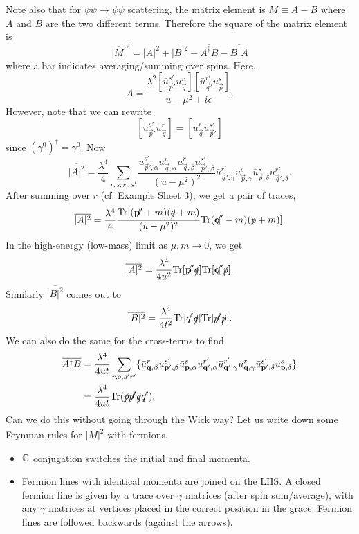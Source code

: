 Note also that for $\psi\psi\to\psi\psi$ scattering, the matrix element is $M\equiv A-B$ where $A$ and $B$ are the two different terms. Therefore the square of the matrix element is
$$\overline{|M|}^2=\overline{|A|^2}+\overline{|B|^2}-\overline{A^\dagger B}- \overline{B^\dagger A}$$
where a bar indicates averaging/summing over spins. Here,
$$A=\frac{\lambda^2 [\bar u_{\vec p'}^{s'} u_{\vec q}^r][\bar u_{\vec q'}^{r'}u_{\vec p}^s]}{u-\mu^2+i\epsilon}.$$
However, note that we can rewrite 
$$[\bar u_{\vec p'}^{s'} u_{\vec q}^r]=[\bar u_{\vec q}^r u_{\vec p'}^{s'}]$$
since $(\gamma^0)^\dagger = \gamma^0.$
Now
$$\overline{|A|^2}=\frac{\lambda^4}{4}\sum_{r,s,r',s'}\frac{\bar u_{\vec p',\alpha}^{s'} u_{\vec q,\alpha}^r \bar u_{\vec q,\beta}^r u_{\vec p',\beta}^{s'}}{(u-\mu^2)^2}\bar u_{\vec q',\gamma}^{r'}u_{\vec p, \gamma}^s \bar u_{\vec p,\delta}^s u_{\vec q',\delta}^{r'}.$$
After summing over $r$ (cf. Example Sheet 3), we get a pair of traces,
$$\overline{|A|^2}=\frac{\lambda^4}{4}\frac{\text{Tr}[(\slashed{\vec p'}+m)(\slashed{q}+m)}{(u-\mu^2)^2}\text{Tr}(\slashed{\vec q'}-m)(\slashed{p}+m)].$$
In the high-energy (low-mass) limit as $\mu,m\to 0$, we get
$$\overline{|A|^2}=\frac{\lambda^4}{4u^2}\text{Tr}[\slashed{\vec p'}\slashed{q}]\text{Tr}[\slashed{\vec q'}\slashed{p}].$$
Similarly $\overline{|B|^2}$ comes out to
$$\overline{|B|^2}=\frac{\lambda^4}{4t^2}\text{Tr}[\slashed{q'}\slashed{q}]\text{Tr}[\slashed{p'}\slashed{p}].$$
We can also do the same for the cross-terms to find
\begin{align*}
    \overline{A^\dagger B}&=\frac{\lambda^4}{4ut} \sum_{r,s,s'r'}\{\bar u_{\boldsymbol{\mathbf{q}},\beta}^r u_{\boldsymbol{\mathbf{p}}',\beta}^{s'} \bar u_{\boldsymbol{\mathbf{p}},\alpha}^s u_{\boldsymbol{\mathbf{q}}',\alpha}^{r'} \bar u_{\boldsymbol{\mathbf{q}}',\gamma}^{r'} u_{\boldsymbol{\mathbf{q}},\gamma}^r \bar u_{\boldsymbol{\mathbf{p}}',\delta}^{s'}u_{\boldsymbol{\mathbf{p}},\delta}^s\}\\
    &=\frac{\lambda^4}{4ut}\text{Tr}(\slashed{p}\slashed{p'}\slashed{q}\slashed{q'}).
\end{align*}
Can we do this without going through the Wick way? Let us write down some Feynman rules for $\overline{|M|^2}$ with fermions.
\begin{itemize}
    \item $\mathbb{C}$ conjugation switches the initial and final momenta.
    \item Fermion lines with identical momenta are joined on the LHS. A closed fermion line is given by a trace over $\gamma$ matrices (after spin sum/average), with any $\gamma$ matrices at vertices placed in the correct position in the grace. Fermion lines are followed backwards (against the arrows).
\end{itemize}
